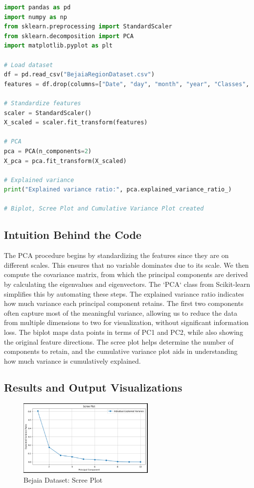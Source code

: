 \documentclass[12pt]{article}
\begin{document}
\begin{lstlisting}[language=Python, caption=PCA Computation Code]
import pandas as pd
import numpy as np
from sklearn.preprocessing import StandardScaler
from sklearn.decomposition import PCA
import matplotlib.pyplot as plt

# Load dataset
df = pd.read_csv("BejaiaRegionDataset.csv")
features = df.drop(columns=["Date", "day", "month", "year", "Classes", "Region"])

# Standardize features
scaler = StandardScaler()
X_scaled = scaler.fit_transform(features)

# PCA
pca = PCA(n_components=2)
X_pca = pca.fit_transform(X_scaled)

# Explained variance
print("Explained variance ratio:", pca.explained_variance_ratio_)

# Biplot, Scree Plot and Cumulative Variance Plot created
\end{lstlisting}

\subsection*{Intuition Behind the Code}

The PCA procedure begins by standardizing the features since they are on different scales. This ensures that no variable dominates due to its scale. We then compute the covariance matrix, from which the principal components are derived by calculating the eigenvalues and eigenvectors. The `PCA` class from Scikit-learn simplifies this by automating these steps. The explained variance ratio indicates how much variance each principal component retains. The first two components often capture most of the meaningful variance, allowing us to reduce the data from multiple dimensions to two for visualization, without significant information loss. The biplot maps data points in terms of PC1 and PC2, while also showing the original feature directions. The scree plot helps determine the number of components to retain, and the cumulative variance plot aids in understanding how much variance is cumulatively explained.

\subsection*{Results and Output Visualizations}

\begin{figure}[h!]
  \centering
  \includegraphics[width=0.6\textwidth]{images/svd_pca_lda/scree_1.png}
  \caption{Bejaia Dataset: Scree Plot}
\end{figure}
\end{document}
